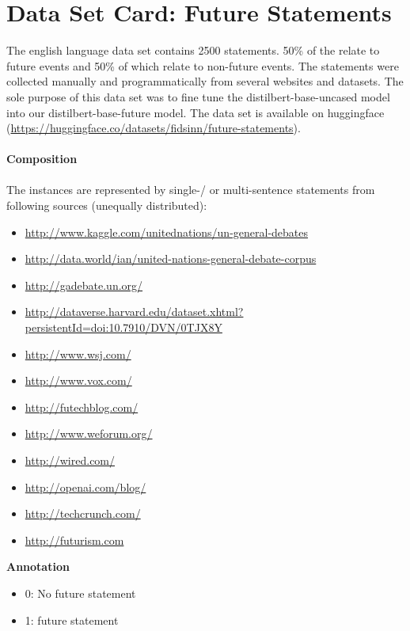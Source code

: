 \section{Data Set Card: Future Statements}
The english language data set contains 2500 statements.
50\% of the relate to future events and 50\% of which relate to non-future events.
The statements were collected manually and programmatically from several websites and datasets.
The sole purpose of this data set was to fine tune the distilbert-base-uncased model into our distilbert-base-future model.
The data set is available on huggingface (\url{https://huggingface.co/datasets/fidsinn/future-statements}).
\\
\\
\textbf{Composition}
\\
\\
The instances are represented by single-/ or multi-sentence statements from following sources (unequally distributed):
%
\begin{itemize}
    \item \url{http://www.kaggle.com/unitednations/un-general-debates}
    \item \url{http://data.world/ian/united-nations-general-debate-corpus}
    \item \url{http://gadebate.un.org/}
    \item \url{http://dataverse.harvard.edu/dataset.xhtml?persistentId=doi:10.7910/DVN/0TJX8Y}
    \item \url{http://www.wsj.com/}
    \item \url{http://www.vox.com/}
    \item \url{http://futechblog.com/}
    \item \url{http://www.weforum.org/}
    \item \url{http://wired.com/}
    \item \url{http://openai.com/blog/}
    \item \url{http://techcrunch.com/}
    \item \url{http://futurism.com}
\end{itemize}
%
\textbf{Annotation}
\begin{itemize}
    \item 0: No future statement
    \item 1: future statement
\end{itemize}%
